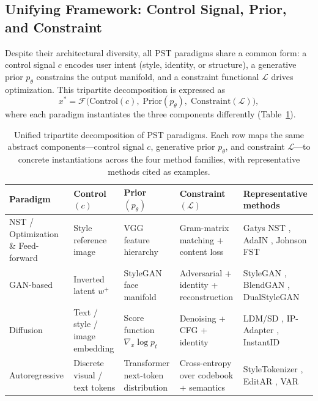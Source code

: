 \documentclass[journal]{IEEEtran}
\begin{document}
\subsection{Unifying Framework: Control Signal, Prior, and Constraint}
\label{sec:theory:unified}

Despite their architectural diversity, all PST paradigms share a common form: a control signal $c$ encodes user intent (style, identity, or structure), a generative prior $p_\theta$ constrains the output manifold, and a constraint functional $\mathcal{L}$ drives optimization. This tripartite decomposition is expressed as
\begin{equation}
x^* = \mathcal{F}\bigl(\text{Control}(c),\; \text{Prior}(p_\theta),\; \text{Constraint}(\mathcal{L})\bigr),
\label{eq:unified}
\end{equation}
where each paradigm instantiates the three components differently (Table~\ref{tab:unified_paradigms}).

\begin{table}[t]
\centering
\caption{Unified tripartite decomposition of PST paradigms. Each row maps the same abstract components---control signal $c$, generative prior $p_\theta$, and constraint $\mathcal{L}$---to concrete instantiations across the four method families, with representative methods cited as examples.}
\label{tab:unified_paradigms}
\small
\begin{tabularx}{\textwidth}{@{}p{2.5cm}XXXp{4.3cm}@{}}
\toprule
\textbf{Paradigm} & \textbf{Control} $(c)$ & \textbf{Prior} $(p_\theta)$ & \textbf{Constraint} $(\mathcal{L})$ & \textbf{Representative methods} \\
\midrule
NST / Optimization \& Feed-forward & Style reference image & VGG feature hierarchy & Gram-matrix matching + content loss & Gatys NST \cite{gatys2015ana}, AdaIN \cite{huang2017arbitraryst}, Johnson FST \cite{johnson2016perceptual} \\
GAN-based & Inverted latent $w^+$ & StyleGAN face manifold & Adversarial + identity + reconstruction & StyleGAN \cite{karras2019style}, BlendGAN \cite{liu2021blendgan}, DualStyleGAN \cite{yang2022dualstylegan} \\
Diffusion & Text / style / image embedding & Score function $\nabla_x \log p_t$ & Denoising + CFG + identity & LDM/SD \cite{rombach_2022_cvpr}, IP-Adapter \cite{ye2023ipadapter}, InstantID \cite{wang2024instantid} \\
Autoregressive & Discrete visual / text tokens & Transformer next-token distribution & Cross-entropy over codebook + semantics & StyleTokenizer \cite{li2024styletokenizerdi}, EditAR \cite{mu2025editar}, VAR \cite{tian2024var} \\
\bottomrule
\end{tabularx}
\end{table}
\end{document}
